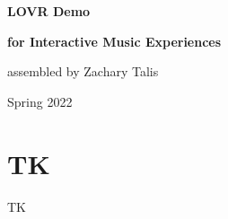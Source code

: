 \documentclass[12pt, letterpaper]{article}
\begin{document}
\begin{titlepage}
    \begin{center}

        \vspace*{5cm}

        \Large{\textbf{LOVR Demo}}

        \vspace{-0.25cm}

        \Large{\textbf{for Interactive Music Experiences}}

        \vspace{0.5cm}

        \large{assembled by Zachary Talis}

        \vfill

        \small{Spring 2022}

    \end{center}
\end{titlepage}

\tableofcontents
\newpage

\section{TK}
TK
\end{document}
